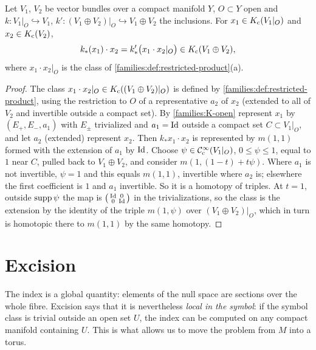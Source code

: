 \begin{lemma}\label{families:lem:natural}
  Let $V_1$, $V_2$ be vector bundles over a compact manifold $Y$, $O\subset Y$
  open and $k:V_1|_O\hookrightarrow V_1$, $k':(V_1\oplus V_2)|_O
  \hookrightarrow V_1\oplus V_2$ the inclusions. For $x_1\in K_{\mathrm{c}}(V_1|_O)$ and
  $x_2\in K_{\mathrm{c}}(V_2)$,
  \begin{equation*}
    k_*(x_1)\cdot x_2=k'_*\bigl(x_1\cdot x_2|_O\bigr)\in K_{\mathrm{c}}(V_1\oplus V_2),
  \end{equation*}
  where $x_1\cdot x_2|_O$ is the class of \cref{families:def:restricted-product}(a).
\end{lemma}
\begin{proof}
  The class $x_1\cdot x_2|_O\in K_{\mathrm{c}}((V_1\oplus V_2)|_O)$ is defined by
  \cref{families:def:restricted-product}, using the restriction to $O$ of a
  representative $a_2$ of $x_2$ (extended to all of $V_2$ and invertible
  outside a compact set). By \ref{families:K-open} represent
  $x_1$ by $(E_+,E_-,a_1)$ with $E_\pm$ trivialized and $a_1=\operatorname{Id}$ outside a
  compact set $C\subset V_1|_O$, and let $a_2$ (extended) represent $x_2$.
  Then $k_*x_1\cdot x_2$ is represented by $m(1,1)$ formed with the extension
  of $a_1$ by $\operatorname{Id}$. Choose $\psi\in\mathcal{C}^\infty_{\mathrm{c}}(V_1|_O)$, $0\le\psi\le1$, equal to $1$
  near $C$, pulled back to $V_1\oplus V_2$, and consider
  $m(1,(1-t)+t\psi)$. Where $a_1$ is not invertible, $\psi=1$ and this equals
  $m(1,1)$, invertible where $a_2$ is; elsewhere the first coefficient is $1$
  and $a_1$ invertible. So it is a homotopy of triples. At $t=1$, outside
  $\operatorname{supp}\psi$ the map is $\bigl(\begin{smallmatrix}\operatorname{Id}&0\\0&\operatorname{Id}
  \end{smallmatrix}\bigr)$ in the trivializations, so the class is the
  extension by the identity of the triple $m(1,\psi)$ over
  $(V_1\oplus V_2)|_O$, which in turn is homotopic there to $m(1,1)$ by the
  same homotopy.
\end{proof}

\section{Excision}\label{families:sec:excision}

The index is a global quantity: elements of the null space are sections over the
whole fibre. Excision says that it is nevertheless \emph{local in the symbol}:
if the symbol class is trivial outside an open set $U$, the index can be
computed on any compact manifold containing $U$. This is what allows us to move
the problem from $M$ into a torus.

